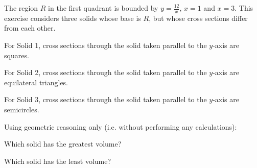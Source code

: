 \documentclass{ximera}
\author{Jim Talamo}
\begin{document}
\begin{exercise}


The region $R$ in the first quadrant is bounded by $y=\frac{12}{x}$, $x=1$ and $x=3$.  This exercise considers three solids whose base is $R$, but whose cross sections differ from each other. 


          \begin{image}
\end{image}


For Solid 1, cross sections through the solid taken parallel to the $y$-axis are squares.

For Solid 2, cross sections through the solid taken parallel to the $y$-axis are equilateral triangles.

For Solid 3, cross sections through the solid taken parallel to the $y$-axis are semicircles.

\begin{exercise}
Using geometric reasoning only (i.e. without performing any calculations):

Which solid has the greatest volume?
\begin{multipleChoice}
\end{multipleChoice}

Which solid has the least volume?
\begin{multipleChoice}
\end{multipleChoice}


\end{exercise}
\end{exercise}
\end{document}

